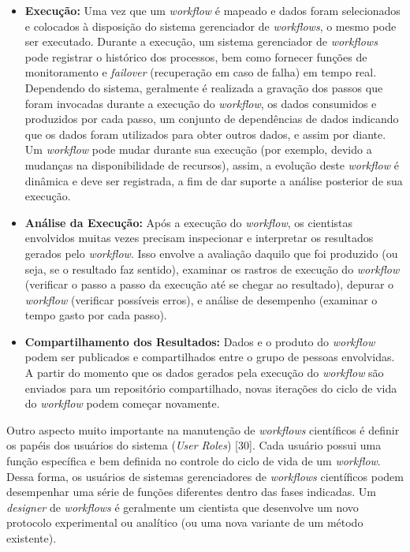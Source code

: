 \begin{itemize}
    \item \textbf{Execução:} Uma vez que um \textit{workflow} é mapeado e dados foram selecionados e colocados à disposição do sistema gerenciador de \textit{workflows}, o mesmo pode ser executado. Durante a execução, um sistema gerenciador de \textit{workflows} pode registrar o histórico dos processos, bem como fornecer funções de monitoramento e \textit{failover} (recuperação em caso de falha) em tempo real. Dependendo do sistema, geralmente é realizada a gravação dos passos que foram invocadas durante a execução do \textit{workflow}, os dados consumidos e produzidos por cada passo, um conjunto de dependências de dados indicando que os dados foram utilizados para obter outros dados, e assim por diante. Um \textit{workflow} pode mudar durante sua execução (por exemplo, devido a mudanças na disponibilidade de recursos), assim, a evolução deste \textit{workflow} é dinâmica e deve ser registrada, a fim de dar suporte a análise posterior de sua execução.
    \item \textbf{Análise da Execução:} Após a execução do \textit{workflow}, os cientistas envolvidos muitas vezes precisam inspecionar e interpretar os resultados gerados pelo \textit{workflow}. Isso envolve a avaliação daquilo que foi produzido (ou seja, se o resultado faz sentido), examinar os rastros de execução do \textit{workflow} (verificar o passo a passo da execução até se chegar ao resultado), depurar o \textit{workflow} (verificar possíveis erros), e análise de desempenho (examinar o tempo gasto por cada passo).
    \item \textbf{Compartilhamento dos Resultados:} Dados e o produto do \textit{workflow} podem ser publicados e compartilhados entre o grupo de pessoas envolvidas. A partir do momento que os dados gerados pela execução do \textit{workflow} são enviados para um repositório compartilhado, novas iterações do ciclo de vida do \textit{workflow} podem começar novamente.
\end{itemize}    
    
Outro aspecto muito importante na manutenção de \textit{workflows} científicos é definir os papéis dos usuários do sistema (\textit{User Roles}) [30]. Cada usuário possui uma função específica e bem definida no controle do ciclo de vida de um \textit{workflow}. Dessa forma, os usuários de sistemas gerenciadores de \textit{workflows} científicos podem desempenhar uma série de funções diferentes dentro das fases indicadas. Um \textit{designer} de \textit{workflows} é geralmente um cientista que desenvolve um novo protocolo experimental ou analítico (ou uma nova variante de um método existente). 

